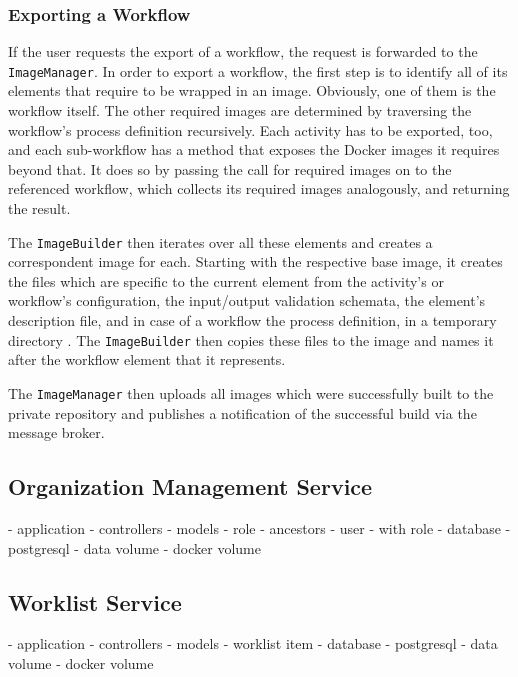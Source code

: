     \subsubsection{Exporting a Workflow} %
      \label{ssub:exporting_a_workflow}
      If the user requests the export of a workflow, the request is forwarded to the \texttt{ImageManager}.
      In order to export a workflow, the first step is to identify all of its elements that require to be wrapped in an image. Obviously, one of them is the workflow itself. The other required images are determined by traversing the workflow's process definition recursively. Each activity has to be exported, too, and each sub-workflow has a method that exposes the Docker images it requires beyond that. It does so by passing the call for required images on to the referenced workflow, which collects its required images analogously, and returning the result.

      The \texttt{ImageBuilder} then iterates over all these elements and creates a correspondent image for each. Starting with the respective base image, it creates the files which are specific to the current element from the activity's or workflow's configuration, \ie the input/output validation schemata, the element's description file, and in case of a workflow the process definition, in a temporary directory . The \texttt{ImageBuilder} then copies these files to the image and names it after the workflow element that it represents.

      The \texttt{ImageManager} then uploads all images which were successfully built to the private repository and publishes a notification of the successful build via the message broker.

  \subsection{Organization Management Service} %
    \label{sub:organization_management_service}
      - application
        - controllers
        - models
          - role
            - ancestors
          - user
            - with role
      - database
        - postgresql
      - data volume
        - docker volume

  \subsection{Worklist Service} %
    \label{sub:worklist_service}
      - application
        - controllers
        - models
          - worklist item
      - database
        - postgresql
      - data volume
        - docker volume

